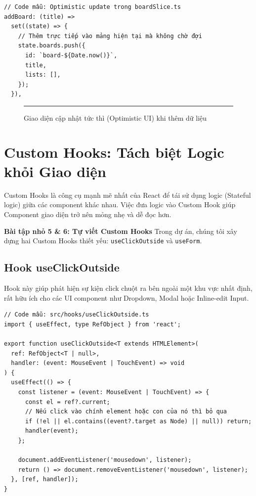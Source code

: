 \begin{Verbatim}
// Code mẫu: Optimistic update trong boardSlice.ts
addBoard: (title) =>
  set((state) => {
    // Thêm trực tiếp vào mảng hiện tại mà không chờ đợi
    state.boards.push({
      id: `board-${Date.now()}`,
      title,
      lists: [],
    });
  }),
\end{Verbatim}

\begin{figure}[H]
    \centering
    \rule{0.8\textwidth}{0.4\textwidth}
    \caption{Giao diện cập nhật tức thì (Optimistic UI) khi thêm dữ liệu}
\end{figure}

\section{Custom Hooks: Tách biệt Logic khỏi Giao diện}
Custom Hooks là công cụ mạnh mẽ nhất của React để tái sử dụng logic (Stateful logic) giữa các component khác nhau. Việc đưa logic vào Custom Hook giúp Component giao diện trở nên mỏng nhẹ và dễ đọc hơn.

\textbf{Bài tập nhỏ 5 \& 6: Tự viết Custom Hooks}
Trong dự án, chúng tôi xây dựng hai Custom Hooks thiết yếu: \texttt{useClickOutside} và \texttt{useForm}.

\subsection{Hook useClickOutside}
Hook này giúp phát hiện sự kiện click chuột ra bên ngoài một khu vực nhất định, rất hữu ích cho các UI component như Dropdown, Modal hoặc Inline-edit Input.

\begin{Verbatim}
// Code mẫu: src/hooks/useClickOutside.ts
import { useEffect, type RefObject } from 'react';

export function useClickOutside<T extends HTMLElement>(
  ref: RefObject<T | null>,
  handler: (event: MouseEvent | TouchEvent) => void
) {
  useEffect(() => {
    const listener = (event: MouseEvent | TouchEvent) => {
      const el = ref?.current;
      // Nếu click vào chính element hoặc con của nó thì bỏ qua
      if (!el || el.contains((event?.target as Node) || null)) return;
      handler(event);
    };

    document.addEventListener('mousedown', listener);
    return () => document.removeEventListener('mousedown', listener);
  }, [ref, handler]);
}
\end{Verbatim}

